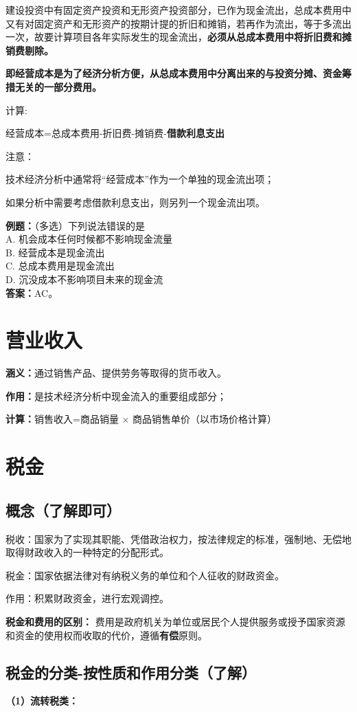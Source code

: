 建设投资中有固定资产投资和无形资产投资部分，已作为现金流出，总成本费用中又有对固定资产和无形资产的按期计提的折旧和摊销，若再作为流出，等于多流出一次，故要计算项目各年实际发生的现金流出，\textbf{必须从总成本费用中将折旧费和摊销费剔除。}

\textbf{即经营成本是为了经济分析方便，从总成本费用中分离出来的与投资分摊、资金筹措无关的一部分费用。}

计算:

经营成本=总成本费用-折旧费-摊销费-\textbf{借款利息支出}

注意：

技术经济分析中通常将“经营成本”作为一个单独的现金流出项；

如果分析中需要考虑借款利息支出，则另列一个现金流出项。

\noindent \textbf{例题：}（多选）下列说法错误的是\\
A. 机会成本任何时候都不影响现金流量\\
B. 经营成本是现金流出\\
C. 总成本费用是现金流出\\
D. 沉没成本不影响项目未来的现金流\\
\textbf{答案：}AC。

\section{营业收入}
\textbf{涵义：}通过销售产品、提供劳务等取得的货币收入。

\textbf{作用：}是技术经济分析中现金流入的重要组成部分；

\textbf{计算：}销售收入=商品销量 × 商品销售单价（以市场价格计算）

\section{税金}
\subsection{概念（了解即可）}
税收：国家为了实现其职能、凭借政治权力，按法律规定的标准，强制地、无偿地取得财政收入的一种特定的分配形式。

税金：国家依据法律对有纳税义务的单位和个人征收的财政资金。

作用：积累财政资金，进行宏观调控。

\textbf{税金和费用的区别：}
费用是政府机关为单位或居民个人提供服务或授予国家资源和资金的使用权而收取的代价，遵循\textbf{有偿}原则。

\subsection{税金的分类-按性质和作用分类（了解）}
\textbf{（1）流转税类：}

